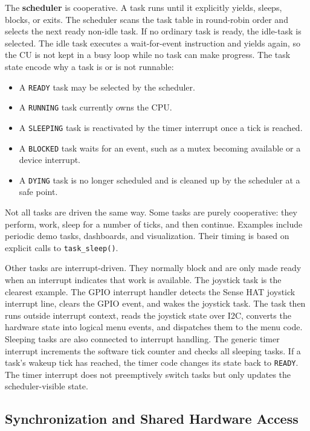 The \textbf{scheduler} is cooperative. A task runs until it explicitly yields, sleeps, blocks, or exits. The scheduler scans the task table in round-robin order and selects the next ready non-idle task. If no ordinary task is ready, the idle-task is selected. The idle task executes a wait-for-event instruction and yields again, so the CU is not kept in a busy loop while no task can make progress. The task state encode why a task is or is not runnable:

\begin{itemize}
	\item A \texttt{READY} task may be selected by the scheduler.
	\item A \texttt{RUNNING} task currently owns the CPU.
	\item A \texttt{SLEEPING} task is reactivated by the timer interrupt once a tick is reached.
	\item A \texttt{BLOCKED} task waits for an event, such as a mutex becoming available or a device interrupt.
	\item A \texttt{DYING} task is no longer scheduled and is cleaned up by the scheduler at a safe point.
\end{itemize}

Not all tasks are driven the same way. Some tasks are purely cooperative: they perform, work, sleep for a number of ticks, and then continue. Examples include periodic demo tasks, dashboards, and visualization. Their timing is based on explicit calls to \texttt{task\_sleep()}.

Other tasks are interrupt-driven. They normally block and are only made ready when an interrupt indicates that work is available. The joystick task is the clearest example. The GPIO interrupt handler detects the Sense HAT joystick interrupt line, clears the GPIO event, and wakes the joystick task. The task then runs outside interrupt context, reads the joystick state over I2C, converts the hardware state into logical menu events, and dispatches them to the menu code. Sleeping tasks are also connected to interrupt handling. The generic timer interrupt increments the software tick counter and checks all sleeping tasks. If a task's wakeup tick has reached, the timer code changes its state back to \texttt{READY}. The timer interrupt does not preemptively switch tasks but only updates the scheduler-visible state.

\subsection{Synchronization and Shared Hardware Access}

